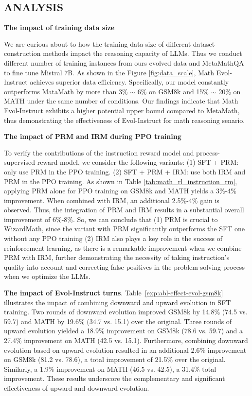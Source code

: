 \subsection{ANALYSIS}

\textbf{The impact of training data size}

We are curious about to how the training data size of different dataset construction methods impact the reasoning capacity of LLMs. Thus we conduct different number of training instances from ours evolved data and MetaMathQA to fine tune Mistral 7B. As shown in the Figure \ref{fig:data_scale}, Math Evol-Instruct achieves superior data efficiency. Specifically, our model  constantly  outperforms MataMath by more than 3\% $\sim$ 6\% on GSM8k and 15\% $\sim$ 20\% on MATH under the same number of conditions. Our findings indicate that Math Evol-Instruct exhibits a higher potential upper bound compared to MetaMath, thus demonstrating the effectiveness of Evol-Instruct for math reasoning senario.

\textbf{The impact of PRM and IRM during PPO training}

To verify the contributions of the instruction reward model and process-supervised reward model, we consider the following variants: (1) SFT + PRM: only use PRM in the PPO training. (2) SFT + PRM + IRM: use both IRM and PRM in the PPO training.  As shown in Table \ref{tab:math_rl_instruction_rm}, applying PRM alone for PPO training on GSM8k and MATH yields a 3\%-4\% improvement. When combined with IRM, an additional 2.5\%-4\% gain is observed. Thus, the integration of PRM and IRM results in a substantial overall improvement of 6\%-8\%. So, we can conclude that (1) PRM is crucial to WizardMath, since the variant with PRM significantly outperforms the SFT one without any PPO training (2) IRM also plays a key role in the success of reinforcement learning, as there is a remarkable improvement when we combine PRM with IRM, further demonstrating the necessity of taking instruction's quality into account and correcting false positives in the problem-solving process when we optimize the LLMs.

\textbf{The impact of Evol-Instruct turns}. Table~\ref{exp:abl-effect-evol-gsm8k} illustrates the impact of combining downward and upward evolution in SFT training. Two rounds of downward evolution improved GSM8k by 14.8\% (74.5 vs. 59.7) and MATH by 19.6\% (34.7 vs. 15.1) over the original. Three rounds of upward evolution yielded a 18.9\% improvement on GSM8k (78.6 vs. 59.7) and a 27.4\% improvement on MATH (42.5 vs. 15.1). Furthermore,  combining downward evolution based on upward evolution resulted in an additional 2.6\% improvement on GSM8k (81.2 vs. 78.6), a total improvement of 21.5\% over the original. Similarly, a 1.9\% improvement on MATH (46.5 vs. 42.5), a 31.4\% total improvement. These results underscore the complementary and significant effectiveness of upward and downward evolution.

